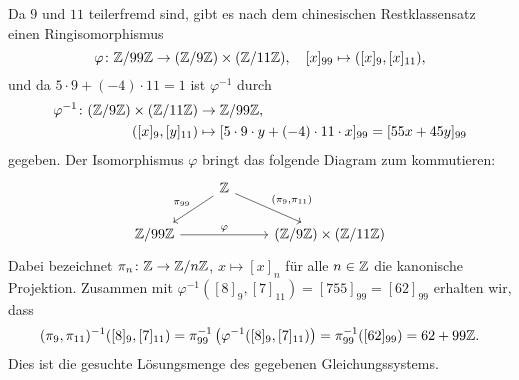 \documentclass[a4paper,10pt,numbers=noenddot]{scrartcl}
\begin{document}
Da $9$ und $11$ teilerfremd sind, gibt es nach dem chinesischen Restklassensatz einen Ringisomorphismus
\[
          \varphi
  \colon  \mathbb{Z}/99\mathbb{Z} \to     (\mathbb{Z}/9\mathbb{Z}) \times (\mathbb{Z}/11\mathbb{Z}),
  \quad   [x]_{99}            \mapsto ([x]_9, [x]_{11}),
\]
und da $5 \cdot 9 + (-4) \cdot 11 = 1$ ist $\varphi^{-1}$ durch
\begin{align*}
          \varphi^{-1}
  \colon  (\mathbb{Z}/9\mathbb{Z}) \times (\mathbb{Z}/11\mathbb{Z}) &\to      \mathbb{Z}/99\mathbb{Z},
  \\
          ([x]_9, [y]_{11})                                 &\mapsto  [5 \cdot 9 \cdot y + (-4) \cdot 11 \cdot x]_{99}
                                                             =        [55 x + 45 y]_{99}
\end{align*}
gegeben.
Der Isomorphismus $\varphi$ bringt das folgende Diagram zum kommutieren:
\begin{equation}
  \label{eqn: commutative diagram}
  \begin{tikzcd}
      {}
    & \Integer
      \arrow[swap]{dl}{\pi_{99}}
      \arrow{dr}{(\pi_9, \pi_{11})}
    & {}
    \\
      \Integer/99\Integer
      \arrow{rr}{\varphi}
    & {}
   & (\Integer/9\Integer) \times (\Integer/11\Integer)
  \end{tikzcd}
\end{equation}
Dabei bezeichnet $\pi_n \colon \mathbb{Z} \to \mathbb{Z}/n\mathbb{Z}$, $x \mapsto [x]_n$ für alle $n \in \mathbb{Z}$ die kanonische Projektion.
Zusammen mit $\varphi^{-1}([8]_9, [7]_{11}) = [755]_{99} = [62]_{99}$ erhalten wir, dass
\[
    (\pi_{9}, \pi_{11})^{-1}([8]_{9}, [7]_{11})
  = \pi_{99}^{-1}\left( \varphi^{-1}([8]_{9}, [7]_{11}) \right)
  = \pi_{99}^{-1}( [62]_{99} )
  = 62 + 99 \mathbb{Z}.
\]
Dies ist die gesuchte Lösungsmenge des gegebenen Gleichungssystems.
\end{document}
